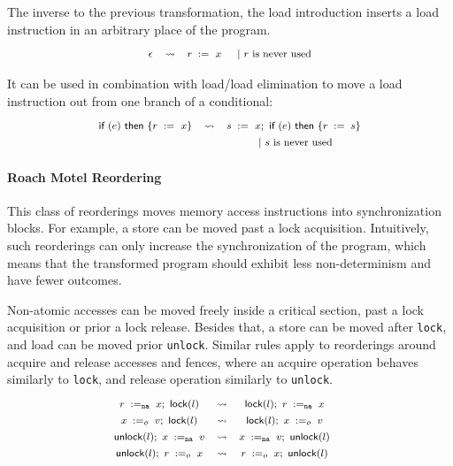 The inverse to the previous transformation, 
the load introduction inserts a load instruction 
in an arbitrary place of the program.
%
\[\def\arraystretch{1.4}\footnotesize
  \begin{array}{cccl} 

      \epsInst
    & \leadsto 
    & \readInst{}{r}{x} 
    & ~|~ \text{$r$ is never used}  \\ 

  \end{array}
\]

It can be used in combination with 
load/load elimination to move a load 
instruction out from one branch of 
a conditional:
%
\[\def\arraystretch{1.4}\footnotesize
  \begin{array}{ccc} 

      \kw{if} (e)~ \kw{then} \{ \readInst{}{r}{x} \}
    & \leadsto 
    & \readInst{}{s}{x} \seq \kw{if} (e)~ \kw{then} \{ \assignInst{r}{s} \} \\
    & & ~|~ \text{$s$ is never used}  \\ 

  \end{array}
\]

\paragraph{Roach Motel Reordering}

This class of reorderings moves memory access instructions
into synchronization blocks. For example, a store 
can be moved past a lock acquisition. 
Intuitively, such reorderings can only increase 
the synchronization of the program, 
which means that the transformed program should 
exhibit less non-determinism and have fewer outcomes. 

Non-atomic accesses can be moved freely inside 
a critical section, \ie past a lock acquisition
or prior a lock release. 
Besides that, a store can be moved after \texttt{lock}, 
and load can be moved prior \texttt{unlock}.   
Similar rules apply to reorderings around 
acquire and release accesses and fences, 
where an acquire operation behaves similarly to \texttt{lock}, 
and release operation similarly to \texttt{unlock}.
\[\def\arraystretch{1.4}\footnotesize
  \begin{array}{cccl} 

      \readInst{\na}{r}{x} \seq \lockInst{l} 
    & \leadsto 
    & \lockInst{l} \seq \readInst{\na}{r}{x}
    & ~ \\ 

      \writeInst{o}{x}{v} \seq \lockInst{l} 
    & \leadsto 
    & \lockInst{l} \seq \writeInst{o}{x}{v}
    & ~  \\ 

      \unlockInst{l} \seq \writeInst{\na}{x}{v} 
    & \leadsto 
    & \writeInst{\na}{x}{v} \seq \unlockInst{l}
    & ~ \\ 


      \unlockInst{l} \seq \readInst{o}{r}{x} 
    & \leadsto 
    & \readInst{o}{r}{x} \seq \unlockInst{l}
    & ~  \\ 

  \end{array}
\]


